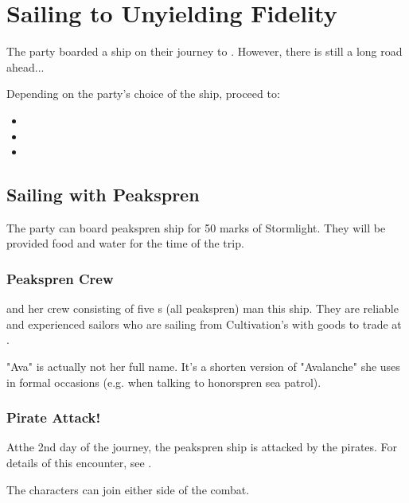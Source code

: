 \section{Sailing to Unyielding Fidelity}
\label{sec:sailingUnyieldingFidelity}

The party boarded a ship on their journey to \locationFidelity{}. However, there is still a long road ahead...

Depending on the party's choice of the ship, proceed to:

\begin{itemize}
	\item {}
	\item {}
	\item {}
\end{itemize}

\subsection{Sailing with Peakspren}
\label{ssec:sailingPeakspren}

The party can board peakspren ship for 50 marks of Stormlight. They will be provided food and water for the time of the trip.

\subsubsection{Peakspren Crew}
\label{ssec:sailingPeaksprenCrew}

\npcPeaksprenCaptain[s]{} and her crew consisting of five \enemyTrueSpren{}s (all peakspren) man this ship. They are reliable and experienced sailors who are sailing from Cultivation's \locationPerpendicularity{} with goods to trade at \locationFidelity{}.

"Ava" is actually not her full name. It's a shorten version of "Avalanche" she uses in formal occasions (e.g. when talking to honorspren sea patrol).

\subsubsection{Pirate Attack!}

Atthe 2nd day of the journey, the peakspren ship is attacked by the pirates. For details of this encounter, see .

The characters can join either side of the combat.

